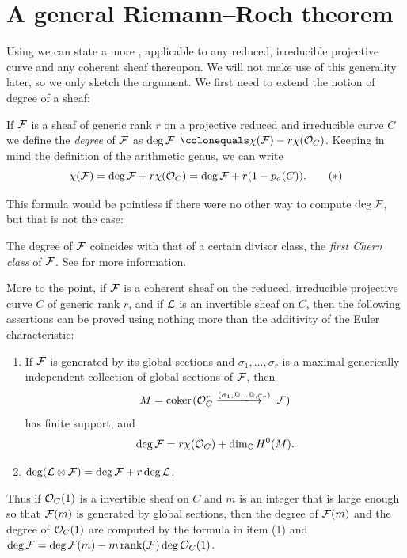 \section{A general Riemann--Roch theorem}

Using 
%
we can state a 
more
,
applicable to any reduced, irreducible projective curve and any coherent sheaf thereupon.
%
We will not make use of
this
generality
later,
so we only sketch the argument.
We first need
to extend the notion of
degree of a sheaf:

\begin{definition}
If ${\mathcal F}$ is a sheaf of generic rank $r$ on a projective reduced and
irreducible curve $C$ we define the 
%
\emph{degree}
of ${\mathcal F}$ 
as $\deg {\mathcal F}$
\unskip ${}\colonequals\chi(\sF) -r\chi(\sO_C)$.
Keeping in mind the definition of the arithmetic genus, we can write
\begin{equation}
\chi({\mathcal F}) = \deg {\mathcal F} + r\chi({\mathcal O}_C) = \deg {\mathcal F} + r(1-p_a(C)).
\tag{$*$}
\label{general RR without duality}
\end{equation}
\end{definition}

This 
formula
would be
pointless
if there were no other way to compute $\deg {\mathcal F}$, but
that is not the case:

\begin{fact} 
The degree of ${\mathcal F}$ 
coincides with that of a certain
divisor class, 
the 
\emph{first Chern class}
%
of ${\mathcal F}$. See
\cite[Chapter~5]{3264}
for more information.

More to the point,
if ${\mathcal F}$ is a coherent sheaf on 
the reduced, irreducible projective curve
$C$ of generic rank $r$, and if ${\mathcal L}$
is an invertible sheaf on $C$, then
the following assertions can be proved using nothing more than the additivity of
the Euler characteristic:
\begin{enumerate}
\def\ruuuto#1{\mathrel{\hbox{$-\mskip-8mu-\mskip-8mu-\mskip-8mu-\mskip-8mu-\mskip-8mu-\mskip-8mu\to$}%
      \kern-40pt
      \raise6pt\hbox{$\scriptstyle#1$}%
      \kern3pt}}
\item If ${\mathcal F}$ is generated by its global sections and $\sigma_1,\dots,
\sigma_r$ is a maximal generically independent
collection of global sections of ${\mathcal F}$, then $$M = \coker(\sO_C^r \ruuuto
{(\sigma_1,@\dots@, \sigma_r)}\sF)$$
has finite support, and
$$
\deg {\mathcal F} = r \chi({\mathcal O}_C)+
\dim_{\mathbb C} H^0(M).
$$

\item $\deg ({\mathcal L} \otimes {\mathcal F}) = \deg {\mathcal F} +r\deg {\mathcal L}$.
\end{enumerate}

Thus if ${\mathcal O}_C(1)$ is a 
invertible sheaf
%
 on $C$ and $m$
is an integer that is
large 
enough so that
${\mathcal F}(m)$ is generated by global sections, then the degree of ${\mathcal F}(m)$
and the degree of ${\mathcal O}_C(1)$ are computed by the formula in item (1)
and $\deg {\mathcal F} = \deg {\mathcal F}(m) - m \operatorname{rank}({\mathcal F}) \deg  {\mathcal O}_C(1)$.
\end{fact}

